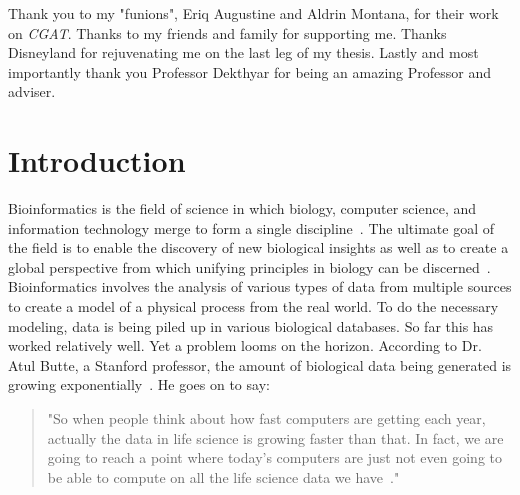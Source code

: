 \documentclass[12pt]{ucthesis}
\begin{document}
\begin{frontmatter}
\begin{abstract}
\end{abstract}



\begin{acknowledgements}

   Thank you to my "funions", Eriq Augustine and Aldrin Montana, for their work on \textit{CGAT}.
   Thanks to my friends and family for supporting me. Thanks Disneyland for rejuvenating me on
   the last leg of my thesis. Lastly and most importantly thank you Professor Dekthyar for
   being an amazing Professor and adviser.

\end{acknowledgements}


\tableofcontents


\listoftables

\listoffigures

\end{frontmatter}

\pagestyle{plain}




\renewcommand{\baselinestretch}{1.66}







\chapter{Introduction}
\label{intro}

Bioinformatics is the field of science in which biology, computer science, and information technology merge to form a single discipline~\cite{bioinformatics_factsheet}. The ultimate goal of the field is to enable the discovery of new biological insights as well as to create a global perspective from which unifying principles in biology can be discerned~\cite{bioinformatics_factsheet}. Bioinformatics involves the analysis of various types of data from multiple sources to create a model of a physical process from the real world. To do the necessary modeling, data is being piled up in various biological databases. So far this has worked relatively well. Yet a problem looms on the horizon. According to Dr. Atul Butte, a Stanford professor, the amount of biological data being generated is growing exponentially~\cite{transcript}. He goes on to say:
\begin{quotation}
"So when people think about how fast computers are getting each year, actually the data in life science is growing faster than that. 
In fact, we are going to reach a point where today's computers are just not even going to be able to compute on all the life science data we have~\cite{transcript}."
\end{quotation}
\end{document}
